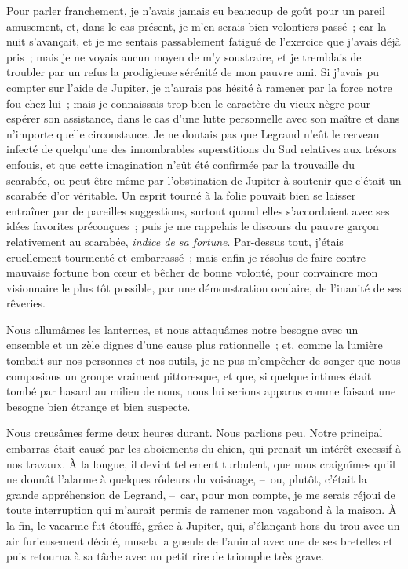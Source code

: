 \documentclass[french,twoside]{book} %
\begin{document}
Pour parler franchement, je n’avais jamais eu beaucoup de goût pour un pareil amusement, et, dans le cas présent, je m’en serais bien volontiers passé ; car la nuit s’avançait, et je me sentais passablement fatigué de l’exercice que j’avais déjà pris ; mais je ne voyais aucun moyen de m’y soustraire, et je tremblais de troubler par un refus la prodigieuse sérénité de mon pauvre ami. Si j’avais pu compter sur l’aide de Jupiter, je n’aurais pas hésité à ramener par la force notre fou chez lui ; mais je connaissais trop bien le caractère du vieux nègre pour espérer son assistance, dans le cas d’une lutte personnelle avec son maître et dans n’importe quelle circonstance. Je ne doutais pas que Legrand n’eût le cerveau infecté de quelqu’une des innombrables superstitions du Sud relatives aux trésors enfouis, et que cette imagination n’eût été confirmée par la trouvaille du scarabée, ou peut-être même par l’obstination de Jupiter à soutenir que c’était un scarabée d’or véritable. Un esprit tourné à la folie pouvait bien se laisser entraîner par de pareilles suggestions, surtout quand elles s’accordaient avec ses idées favorites préconçues ; puis je me rappelais le discours du pauvre garçon relativement au scarabée, \emph{indice de sa fortune}. Par-dessus tout, j’étais cruellement tourmenté et embarrassé ; mais enfin je résolus de faire contre mauvaise fortune bon cœur et bêcher de bonne volonté, pour convaincre mon visionnaire le plus tôt possible, par une démonstration oculaire, de l’inanité de ses rêveries.\par
Nous allumâmes les lanternes, et nous attaquâmes notre besogne avec un ensemble et un zèle dignes d’une cause plus rationnelle ; et, comme la lumière tombait sur nos personnes et nos outils, je ne pus m’empêcher de songer que nous composions un groupe vraiment pittoresque, et que, si quelque intimes était tombé par hasard au milieu de nous, nous lui serions apparus comme faisant une besogne bien étrange et bien suspecte.\par
Nous creusâmes ferme deux heures durant. Nous parlions peu. Notre principal embarras était causé par les aboiements du chien, qui prenait un intérêt excessif à nos travaux. À la longue, il devint tellement turbulent, que nous craignîmes qu’il ne donnât l’alarme à quelques rôdeurs du voisinage, – ou, plutôt, c’était la grande appréhension de Legrand, – car, pour mon compte, je me serais réjoui de toute interruption qui m’aurait permis de ramener mon vagabond à la maison. À la fin, le vacarme fut étouffé, grâce à Jupiter, qui, s’élançant hors du trou avec un air furieusement décidé, musela la gueule de l’animal avec une de ses bretelles et puis retourna à sa tâche avec un petit rire de triomphe très grave.\par
\end{document}
